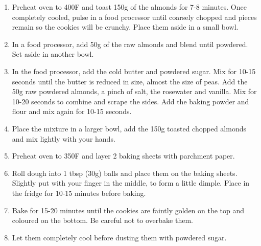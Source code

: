 \begin{enumerate}
    \item Preheat oven to 400\degree F and toast 150g of the almonds for 7-8 minutes. Once completely cooled, pulse in a food processor until coarsely chopped and pieces remain so the cookies will be crunchy. Place them aside in a small bowl.
    \item In a food processor, add 50g of the raw almonds and blend until powdered. Set aside in another bowl.
    \item In the food processor, add the cold butter and powdered sugar. Mix for 10-15 seconds until the butter is reduced in size, almost the size of peas. Add the 50g raw powdered almonds, a pinch of salt, the rosewater and vanilla. Mix for 10-20 seconds to combine and scrape the sides. Add the baking powder and flour and mix again for 10-15 seconds.
    \item Place the mixture in a larger bowl, add the 150g toasted  chopped almonds and mix lightly with your hands.
    \item Preheat oven to 350\degree F and layer 2 baking sheets with parchment paper.
    \item Roll dough into 1 tbsp (30g) balls and place them on the baking sheets. Slightly put with your finger in the middle, to form a little dimple. Place in the fridge for 10-15 minutes before baking.
    \item Bake for 15-20 minutes until the cookies are faintly golden on the top and coloured on the bottom. Be careful not to overbake them.
    \item Let them completely cool before dusting them with powdered sugar.
\end{enumerate}
